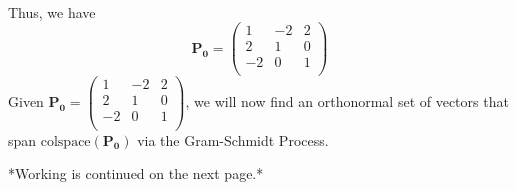 \documentclass{article}
\newcommand{\bs}[1]{\boldsymbol{#1}}
\begin{document}
    \newline\\
    Thus, we have $$\bs{P_0} = \left(\begin{array}{ccc}
      1 & -2 & 2 \\
      2 & 1 & 0 \\
      -2 & 0 &  1 \\
    \end{array}\right)$$
    Given $\bs{P_0} = \left(\begin{array}{ccc}
      1 & -2 & 2 \\
      2 & 1 & 0 \\
      -2 & 0 &  1 \\
    \end{array}\right)$, we will now find an orthonormal set of vectors that span $\text{colspace}(\bs{P_0})$ via the Gram-Schmidt Process.
    \vfill
\begin{center}
    *Working is continued on the next page.*
\end{center}
\newpage 
\end{document}
